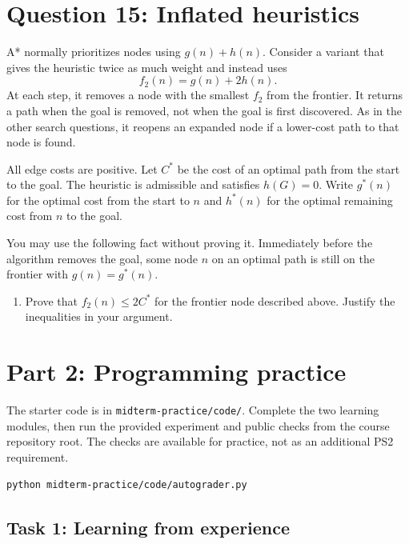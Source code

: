 \documentclass[11pt]{article}
\newenvironment{studentanswer}[1]
  {\par\medskip\noindent
   \begin{tcolorbox}[height from=#1 to 100cm, colback=white, colframe=gray!60,
     boxrule=0.6pt, arc=0pt, outer arc=0pt, left=7pt, right=7pt,
     top=7pt, bottom=7pt, title={Answer / work}, fonttitle=\small,
     coltitle=black, colbacktitle=gray!8, titlerule=0pt]
   \ignorespaces}
  {\end{tcolorbox}\par}
\begin{document}
\clearpage
\section*{Question 15: Inflated heuristics}
A* normally prioritizes nodes using $g(n)+h(n)$. Consider a variant
that gives the heuristic twice as much weight and instead uses
\[ f_2(n)=g(n)+2h(n). \]
At each step, it removes a node with the smallest $f_2$ from the frontier.
It returns a path when the goal is removed, not when the goal is first
discovered. As in the other search questions, it reopens an expanded
node if a lower-cost path to that node is found.

All edge costs are positive. Let $C^*$ be the cost of an optimal path
from the start to the goal. The heuristic is admissible and satisfies
$h(G)=0$. Write $g^*(n)$ for the optimal cost from the start to $n$ and
$h^*(n)$ for the optimal remaining cost from $n$ to the goal.

You may use the following fact without proving it. Immediately before
the algorithm removes the goal, some node $n$ on an optimal path is
still on the frontier with $g(n)=g^*(n)$.

\begin{enumerate}[label=(\alph*)]
\item Prove that $f_2(n)\le2C^*$ for the frontier node
described above. Justify the inequalities in your argument.

\begin{studentanswer}{8cm}
\end{studentanswer}

\end{enumerate}

\clearpage
\section*{Part 2: Programming practice}
The starter code is in \texttt{midterm-practice/code/}. Complete the
two learning modules, then run the provided experiment and public checks
from the course repository root. The checks are available for practice,
not as an additional PS2 requirement.
\begin{verbatim}
python midterm-practice/code/autograder.py
\end{verbatim}
\subsection*{Task 1: Learning from experience}
\end{document}
